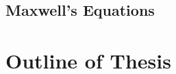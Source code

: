 \documentclass[12pt]{ociamthesis}
\begin{document}
\subsection{Maxwell's Equations}
\label{subsec:Max}

\section{Outline of Thesis}



  
\end{document}
